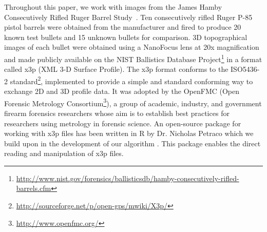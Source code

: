 \documentclass[aoas, preprint]{imsart}\usepackage[]{graphicx}\usepackage[]{color}
\begin{document}
Throughout this paper, we work with images from the James Hamby Consecutively Rifled Ruger Barrel Study~\citep{hamby:2009}. Ten consecutively rifled Ruger P-85 pistol barrels were obtained from the manufacturer and fired to produce 20 known test bullets and 15 unknown bullets for comparison. 
3D topographical images of each bullet were obtained using a NanoFocus lens at 20x magnification and made publicly available on the NIST Ballistics Database Project\footnote{\url{http://www.nist.gov/forensics/ballisticsdb/hamby-consecutively-rifled-barrels.cfm}} in a format called x3p (XML 3-D Surface Profile). The x3p format conforms to the ISO5436-2 standard\footnote{\url{http://sourceforge.net/p/open-gps/mwiki/X3p/}}, implemented to provide a simple and standard conforming way to exchange 2D and 3D profile data. It was adopted by the OpenFMC (Open Forensic Metrology Consortium\footnote{\url{http://www.openfmc.org/}}), a group of academic, industry, and government firearm forensics researchers whose aim is to establish best practices for researchers using metrology in forensic science. An open-source package for working with x3p files has been written in R \citep{R} by Dr. Nicholas Petraco which we build upon in the development of our algorithm \citep{x3pr}. This package enables the direct reading and manipulation of x3p files.
\end{document}
